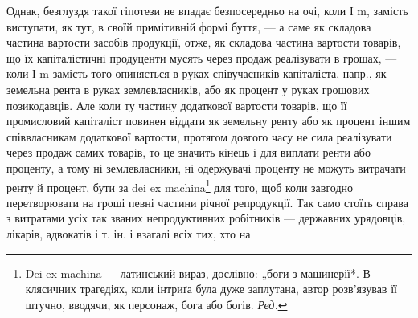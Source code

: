 Однак, безглуздя такої гіпотези не впадає безпосередньо на очі, коли І m,
замість виступати, як тут, в своїй примітивній формі буття, — а саме як
складова частина вартости засобів продукції, отже, як складова частина
вартости товарів, що їх капіталістичні продуценти мусять через продаж
реалізувати в грошах, — коли І m замість того опиняється в руках співучасників
капіталіста, напр., як земельна рента в руках землевласників,
або як процент у руках грошових позикодавців. Але коли ту частину додаткової
вартости товарів, що її промисловий капіталіст повинен віддати
як земельну ренту або як процент іншим співвласникам додаткової вартости,
протягом довгого часу не сила реалізувати через продаж самих
товарів, то це значить кінець і для виплати ренти або проценту, а тому
ні землевласники, ні одержувачі проценту не можуть витрачати ренту й
процент, бути за dei ex machina\footnote*{
Dei ex machina — латинський вираз, дослівно: „боги з машинерії*. В клясичних
трагедіях, коли інтриґа була дуже заплутана, автор розв’язував її штучно,
вводячи, як персонаж, бога або богів. \emph{Ред.}
} для того, щоб коли завгодно перетворювати
на гроші певні частини річної репродукції. Так само стоїть
справа з витратами усіх так званих непродуктивних робітників — державних
урядовців, лікарів, адвокатів і т. ін. і взагалі всіх тих, хто на
\parbreak{}  %
